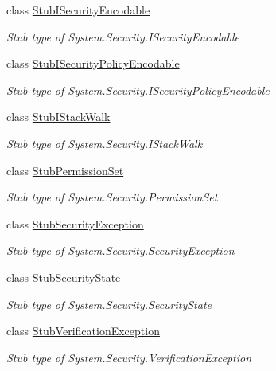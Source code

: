 \begin{DoxyCompactItemize}
class \hyperlink{class_system_1_1_security_1_1_fakes_1_1_stub_i_security_encodable}{Stub\-I\-Security\-Encodable}
\begin{DoxyCompactList}\small\item\em Stub type of System.\-Security.\-I\-Security\-Encodable\end{DoxyCompactList}\item 
class \hyperlink{class_system_1_1_security_1_1_fakes_1_1_stub_i_security_policy_encodable}{Stub\-I\-Security\-Policy\-Encodable}
\begin{DoxyCompactList}\small\item\em Stub type of System.\-Security.\-I\-Security\-Policy\-Encodable\end{DoxyCompactList}\item 
class \hyperlink{class_system_1_1_security_1_1_fakes_1_1_stub_i_stack_walk}{Stub\-I\-Stack\-Walk}
\begin{DoxyCompactList}\small\item\em Stub type of System.\-Security.\-I\-Stack\-Walk\end{DoxyCompactList}\item 
class \hyperlink{class_system_1_1_security_1_1_fakes_1_1_stub_permission_set}{Stub\-Permission\-Set}
\begin{DoxyCompactList}\small\item\em Stub type of System.\-Security.\-Permission\-Set\end{DoxyCompactList}\item 
class \hyperlink{class_system_1_1_security_1_1_fakes_1_1_stub_security_exception}{Stub\-Security\-Exception}
\begin{DoxyCompactList}\small\item\em Stub type of System.\-Security.\-Security\-Exception\end{DoxyCompactList}\item 
class \hyperlink{class_system_1_1_security_1_1_fakes_1_1_stub_security_state}{Stub\-Security\-State}
\begin{DoxyCompactList}\small\item\em Stub type of System.\-Security.\-Security\-State\end{DoxyCompactList}\item 
class \hyperlink{class_system_1_1_security_1_1_fakes_1_1_stub_verification_exception}{Stub\-Verification\-Exception}
\begin{DoxyCompactList}\small\item\em Stub type of System.\-Security.\-Verification\-Exception\end{DoxyCompactList}\end{DoxyCompactItemize}
